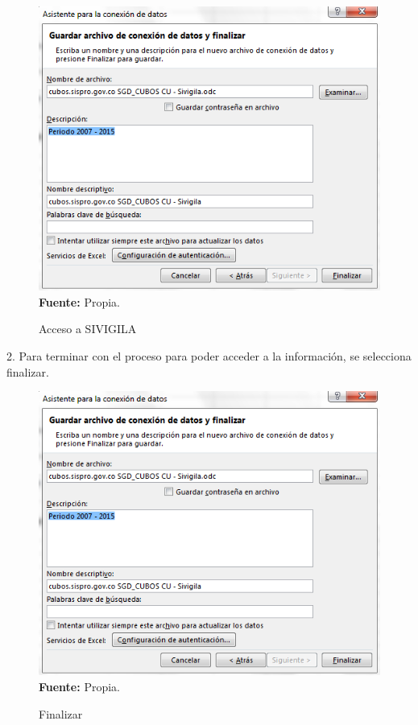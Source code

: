 \documentclass[a4paper,openright,12pt]{book}
\theoremstyle{definition}
\theoremstyle{remark}
\begin{document}
\begin{figure}[h]
\centering
\caption{Acceso a SIVIGILA} 
\includegraphics[scale=0.4]{Rips6}
\label{fig:Rips6}
\\ \textbf{Fuente:} Propia.
\end{figure}
2. Para terminar con el proceso para poder acceder a la información, se selecciona finalizar.
\begin{figure}[h]
\centering
\caption{Finalizar} 
\includegraphics[scale=0.7]{Rips6}
\label{fig:Rips16}
\\ \textbf{Fuente:} Propia.
\end{figure}
\end{document}
